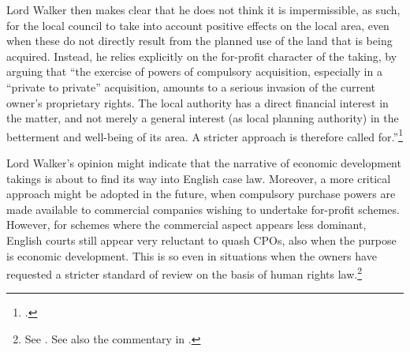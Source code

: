 Lord Walker then makes clear that he does not think it is impermissible, as such, for the local council to take into account positive effects on the local area, even when these do not directly result from the planned use of the land that is being acquired. Instead, he relies explicitly on the for-profit character of the taking, by arguing that ``the exercise of powers of compulsory acquisition, especially in a ``private to private'' acquisition, amounts to a serious invasion of the current owner's proprietary rights. The local authority has a direct financial interest in the matter, and not merely a general interest (as local planning authority) in the betterment and well-being of its area. A stricter approach is therefore called for.''\footcite[84]{sainsbury10} 

Lord Walker's opinion might indicate that the narrative of economic development takings is about to find its way into English case law. Moreover, a more critical approach might be adopted in the future, when compulsory purchase powers are made available to commercial companies wishing to undertake for-profit schemes. However, for schemes where the commercial aspect appears less dominant, English courts still appear very reluctant to quash CPOs, also when the purpose is economic development. This is so even in situations when the owners have requested a stricter standard of review on the basis of human rights law.\footnote{See \cite{smith08,alliance06}. See also the commentary in \cite[]{gray11}.}

